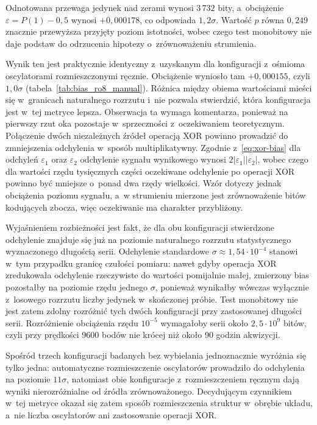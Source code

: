 Odnotowana przewaga jedynek nad zerami wynosi $3\,732$ bity, a~obciążenie
$\varepsilon = P(1) - 0{,}5$ wynosi $+0{,}000178$, co odpowiada $1{,}2\sigma$.
Wartość $p$ równa $0{,}249$ znacznie przewyższa przyjęty poziom istotności, wobec
czego test monobitowy nie daje podstaw do odrzucenia hipotezy o~zrównoważeniu
strumienia.

Wynik ten jest praktycznie identyczny z~uzyskanym dla konfiguracji z~ośmioma
oscylatorami rozmieszczonymi ręcznie. Obciążenie wyniosło tam $+0{,}000155$, czyli
$1{,}0\sigma$ (tabela~\ref{tab:bias_ro8_manual}). Różnica między obiema wartościami
mieści się w~granicach naturalnego
rozrzutu i~nie pozwala stwierdzić, która konfiguracja jest w~tej metryce lepsza.
Obserwacja ta wymaga komentarza, ponieważ na pierwszy rzut oka pozostaje
w~sprzeczności z~oczekiwaniem teoretycznym. Połączenie dwóch niezależnych źródeł
operacją XOR powinno prowadzić do zmniejszenia odchylenia w~sposób multiplikatywny.
Zgodnie z~\eqref{eq:xor-bias} dla odchyleń $\varepsilon_1$ oraz $\varepsilon_2$
odchylenie sygnału wynikowego wynosi $2|\varepsilon_1||\varepsilon_2|$, wobec czego
dla wartości rzędu tysięcznych części oczekiwane odchylenie po operacji XOR
powinno być mniejsze o~ponad dwa rzędy wielkości. Wzór dotyczy jednak obciążenia
poziomu sygnału, a~w strumieniu mierzone jest zrównoważenie bitów kodujących
zbocza, więc oczekiwanie ma charakter przybliżony.

Wyjaśnieniem rozbieżności jest fakt, że dla obu konfiguracji stwierdzone
odchylenie znajduje się już na poziomie naturalnego rozrzutu statystycznego
wyznaczonego długością serii. Odchylenie standardowe
$\sigma \approx 1{,}54 \cdot 10^{-4}$ stanowi w~tym przypadku granicę czułości
pomiaru: nawet gdyby operacja XOR zredukowała odchylenie rzeczywiste do wartości
pomijalnie małej, zmierzony bias pozostałby na poziomie rzędu jednego $\sigma$,
ponieważ wynikałby wówczas wyłącznie z~losowego rozrzutu liczby jedynek
w~skończonej próbie. Test monobitowy nie jest zatem zdolny rozróżnić tych dwóch
konfiguracji przy zastosowanej długości serii. Rozróżnienie obciążenia rzędu
$10^{-5}$ wymagałoby serii około $2{,}5 \cdot 10^{9}$ bitów, czyli przy prędkości
9600 bodów nie krócej niż około 90 godzin akwizycji.

Spośród trzech konfiguracji badanych bez wybielania jednoznacznie wyróżnia się
tylko jedna: automatyczne rozmieszczenie oscylatorów prowadziło do odchylenia na
poziomie $11\sigma$, natomiast obie konfiguracje z~rozmieszczeniem ręcznym dają
wyniki nierozróżnialne od źródła zrównoważonego. Decydującym czynnikiem w~tej
metryce okazał się zatem sposób rozmieszczenia struktur w~obrębie układu, a~nie
liczba oscylatorów ani zastosowanie operacji XOR.


